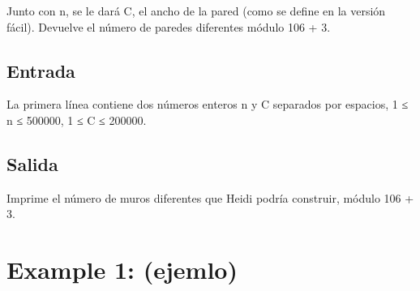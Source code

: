 \documentclass{article}
\begin{document}
    \begin{flushleft}
        Junto con n, se le dará C, el ancho de la pared (como se define en la versión fácil). Devuelve el número de paredes diferentes módulo 106 + 3.
    \end{flushleft}

    \subsection*{Entrada}

    \begin{flushleft}
        La primera línea contiene dos números enteros n y C separados por espacios, 1 ≤ n ≤ 500000, 1 ≤ C ≤ 200000.
    \end{flushleft}


    \subsection*{Salida}
    \begin{flushleft}
        Imprime el número de muros diferentes que Heidi podría construir, módulo 106 + 3.
    \end{flushleft}


    \section*{Example 1: (ejemlo)}
\end{document}
